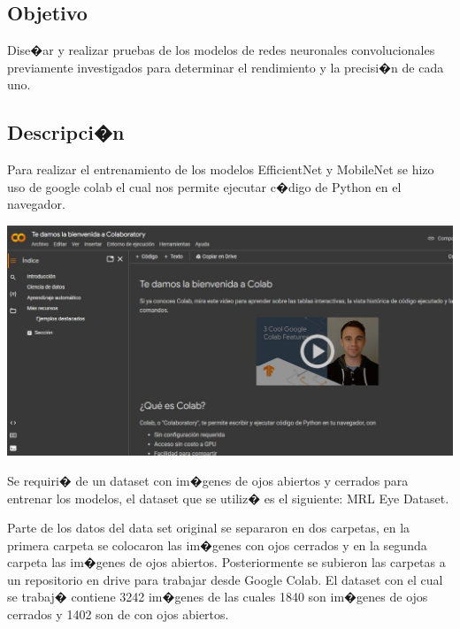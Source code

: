 \documentclass[12pt,letterpaper]{article}
\begin{document}
\subsection{Objetivo}
Dise�ar y realizar pruebas de los modelos de redes neuronales convolucionales previamente investigados para determinar el rendimiento y la precisi�n de cada uno.

\subsection{Descripci�n}

Para realizar el entrenamiento de los modelos EfficientNet y MobileNet se hizo uso de google colab el cual nos permite ejecutar c�digo de Python en el navegador.

\begin{center}
  \includegraphics[scale=0.5]{imagenes/ggco.JPG}
 \label{fig:GoogleCo} 
\end{center} 



Se requiri� de un dataset con im�genes de ojos abiertos y cerrados para entrenar los modelos, el dataset que se utiliz� es el siguiente: MRL Eye Dataset\cite{dataset}.

Parte de los datos del data set original se separaron en dos carpetas, en la primera carpeta se colocaron las im�genes con ojos cerrados y en la segunda carpeta las im�genes de ojos abiertos. Posteriormente se subieron las carpetas a un repositorio en drive para trabajar desde Google Colab. El dataset con el cual se trabaj� contiene 3242 im�genes de las cuales 1840 son im�genes de ojos cerrados y 1402 son de con ojos abiertos. 
\end{document}
